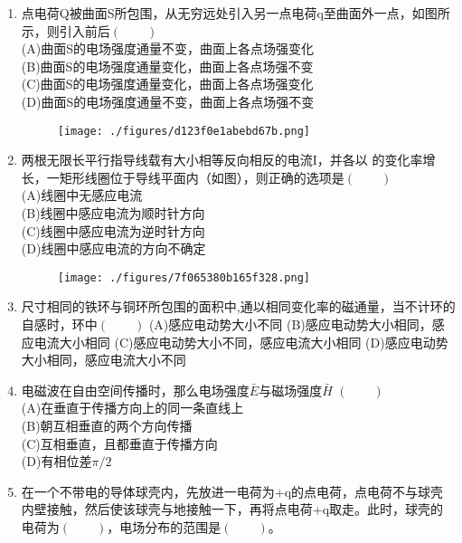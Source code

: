 \begin{enumerate}
(A)半径为R的无限长均匀带电圆柱体电场的E-r 关系\\
(B)半径为R的无限长均匀带电圆柱面电场的E-r 关系\\
(C)半径为R的均匀带正电球体电场的U-r关系\\
(D)半径为R的均匀带正电球面电场的U-r关系
\begin{figure}[ht]
\centering
\texttt{[image: ./figures/dabd5d896393286f.png]}
\caption{} \label{fig_HDSD13_3}
\end{figure}
\item 点电荷Q被曲面S所包围，从无穷远处引入另一点电荷q至曲面外一点，如图所示，则引入前后$(\qquad)$\\
(A)曲面S的电场强度通量不变，曲面上各点场强变化\\
(B)曲面S的电场强度通量变化，曲面上各点场强不变\\
(C)曲面S的电场强度通量变化，曲面上各点场强变化\\
(D)曲面S的电场强度通量不变，曲面上各点场强不变
\begin{figure}[ht]
\centering
\texttt{[image: ./figures/d123f0e1abebd67b.png]}
\caption{} \label{fig_HDSD13_2}
\end{figure}
\item 两根无限长平行指导线载有大小相等反向相反的电流I，并各以  的变化率增长，一矩形线圈位于导线平面内（如图），则正确的选项是$(\qquad)$\\
(A)线圈中无感应电流\\
(B)线圈中感应电流为顺时针方向\\
(C)线圈中感应电流为逆时针方向\\
(D)线圈中感应电流的方向不确定
\begin{figure}[ht]
\centering
\texttt{[image: ./figures/7f065380b165f328.png]}
\caption{} \label{fig_HDSD13_4}
\end{figure}
\item 尺寸相同的铁环与铜环所包围的面积中,通以相同变化率的磁通量，当不计环的自感时，环中$(\qquad)$
(A)感应电动势大小不同
(B)感应电动势大小相同，感应电流大小相同
(C)感应电动势大小不同，感应电流大小相同
(D)感应电动势大小相同，感应电流大小不同
\item 电磁波在自由空间传播时，那么电场强度$\bar E$与磁场强度$\bar H$ $(\qquad)$\\
(A)在垂直于传播方向上的同一条直线上\\
(B)朝互相垂直的两个方向传播\\
(C)互相垂直，且都垂直于传播方向\\
(D)有相位差$\pi/2$
\item 在一个不带电的导体球壳内，先放进一电荷为+q的点电荷，点电荷不与球壳内壁接触，然后使该球壳与地接触一下，再将点电荷+q取走。此时，球壳的电荷为$(\qquad)$，电场分布的范围是$(\qquad)$。

\end{enumerate}
